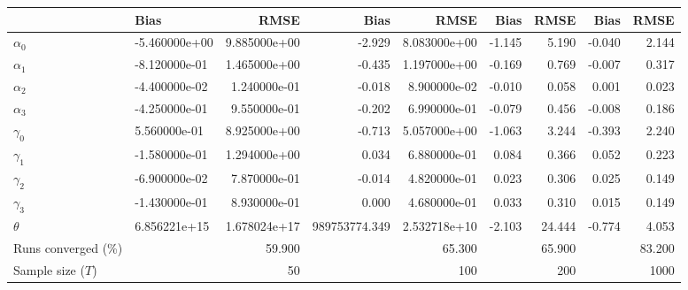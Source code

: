 
\begin{tabular}[t]{llrrrrrrr}
\toprule
  & Bias & RMSE & Bias & RMSE & Bias & RMSE & Bias & RMSE\\
\midrule
$\alpha_{0}$ & -5.460000e+00 & 9.885000e+00 & -2.929 & 8.083000e+00 & -1.145 & 5.190 & -0.040 & 2.144\\
$\alpha_{1}$ & -8.120000e-01 & 1.465000e+00 & -0.435 & 1.197000e+00 & -0.169 & 0.769 & -0.007 & 0.317\\
$\alpha_{2}$ & -4.400000e-02 & 1.240000e-01 & -0.018 & 8.900000e-02 & -0.010 & 0.058 & 0.001 & 0.023\\
$\alpha_{3}$ & -4.250000e-01 & 9.550000e-01 & -0.202 & 6.990000e-01 & -0.079 & 0.456 & -0.008 & 0.186\\
$\gamma_{0}$ & 5.560000e-01 & 8.925000e+00 & -0.713 & 5.057000e+00 & -1.063 & 3.244 & -0.393 & 2.240\\
$\gamma_{1}$ & -1.580000e-01 & 1.294000e+00 & 0.034 & 6.880000e-01 & 0.084 & 0.366 & 0.052 & 0.223\\
$\gamma_{2}$ & -6.900000e-02 & 7.870000e-01 & -0.014 & 4.820000e-01 & 0.023 & 0.306 & 0.025 & 0.149\\
$\gamma_{3}$ & -1.430000e-01 & 8.930000e-01 & 0.000 & 4.680000e-01 & 0.033 & 0.310 & 0.015 & 0.149\\
$\theta$ & 6.856221e+15 & 1.678024e+17 & 989753774.349 & 2.532718e+10 & -2.103 & 24.444 & -0.774 & 4.053\\
Runs converged (\%) &  & 59.900 &  & 65.300 &  & 65.900 &  & 83.200\\
Sample size ($T$) &  & 50 &  & 100 &  & 200 &  & 1000\\
\bottomrule
\end{tabular}
